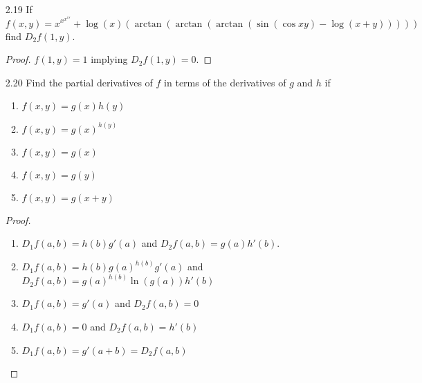 \begin{enumerate}
\begin{proof}
\begin{enumerate}
        \item 
        \begin{align*}
            D_1f(c,d) &= 0 \\
            D_2f(c,d) &= g(G(d)-G(b))\cdot g(d)
        \end{align*}
    \end{enumerate}
    \end{proof}
    
    \item[2.19] If \( f(x,y) = x^{x^{x^{x^{y}}}}+\log(x)(\arctan(\arctan(\arctan(\sin(\cos xy)-\log(x+y))))) \) find \( D_2f(1,y) \). 
    
    \begin{proof}
    \( f(1,y) = 1 \) implying \( D_2f(1,y) = 0 \). 
    \end{proof}

    \item[2.20] Find the partial derivatives of \( f \) in terms of the derivatives of \( g \) and \( h \) if
    \begin{enumerate}
        \item \( f(x,y) = g(x)h(y) \)
        
        \item \( f(x,y) = g(x)^{h(y)} \)
        
        \item \( f(x,y) = g(x) \)
        
        \item \( f(x,y) = g(y) \)
        
        \item \( f(x,y) = g(x+y) \)
    \end{enumerate}
    
    \begin{proof}
    \begin{enumerate}
        \item \( D_{1}f(a,b) = h(b)g'(a)\) and \( D_{2}f(a,b) = g(a)h'(b) \).
        
        \item \( D_{1}f(a,b) = h(b)g(a)^{h(b)}g'(a) \) and \( D_2f(a,b) = g(a)^{h(b)}\ln(g(a))h'(b) \)
        
        \item \( D_{1}f(a,b) = g'(a) \) and \( D_2f(a,b) = 0 \)
        
        \item \( D_{1}f(a,b) = 0 \) and \( D_2f(a,b) = h'(b) \)
        
        \item \( D_{1}f(a,b) = g'(a+b) = D_{2}f(a,b) \)
    \end{enumerate}
    \end{proof}
    

\end{enumerate}
